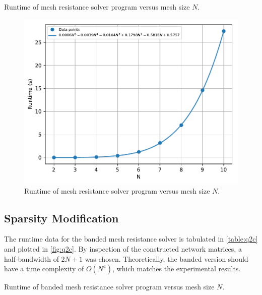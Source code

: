 \documentclass[a4paper,titlepage]{article}
\begin{document}
	\begin{table}[!htb]
		\centering
		\caption{Runtime of mesh resistance solver program versus mesh size $N$.}
		\label{table:q2b}
	\end{table}

	\begin{figure}[!htb]
		\centering
		\includegraphics[width=\columnwidth]{plots/q2b.pdf}
		\caption
		{Runtime of mesh resistance solver program versus mesh size $N$.}
		\label{fig:q2b}
	\end{figure}
	
	\subsection{Sparsity Modification}
	
	The runtime data for the banded mesh resistance solver is tabulated in \autoref{table:q2c} and plotted in \autoref{fig:q2c}. By inspection of the constructed network matrices, a half-bandwidth of $2N + 1$ was chosen. Theoretically, the banded version should have a time complexity of $O(N^4)$, which matches the experimental results.
	
	\begin{table}[!htb]
		\centering
		\caption{Runtime of banded mesh resistance solver program versus mesh size $N$.}
		\label{table:q2c}
	\end{table}
\end{document}
